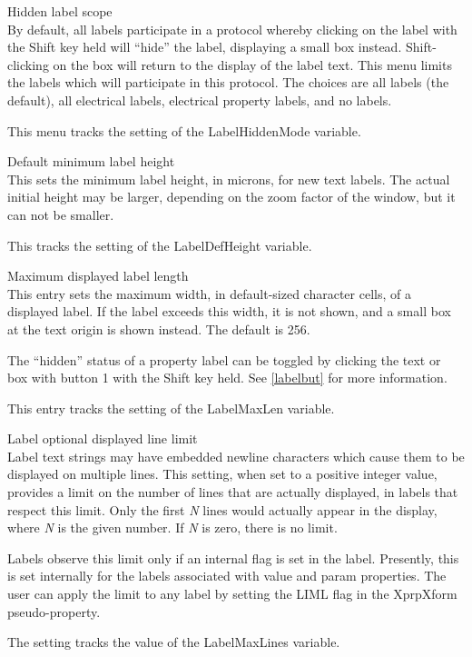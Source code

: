 \begin{description}
\item{\cb Hidden label scope}\\
By default, all labels participate in a protocol whereby clicking on
the label with the {\kb Shift} key held will ``hide'' the label,
displaying a small box instead.  {\kb Shift}-clicking on the box will
return to the display of the label text.  This menu limits the labels
which will participate in this protocol.  The choices are {\cb all
labels} (the default), {\cb all electrical labels}, {\cb electrical
property labels}, and {\cb no labels}.

This menu tracks the setting of the {\et LabelHiddenMode} variable.

\item{\cb Default minimum label height}\\
This sets the minimum label height, in microns, for new text labels. 
The actual initial height may be larger, depending on the zoom factor
of the window, but it can not be smaller. 

This tracks the setting of the {\et LabelDefHeight} variable.

\item{\cb Maximum displayed label length}\\
This entry sets the maximum width, in default-sized character cells,
of a displayed label.  If the label exceeds this width,
it is not shown, and a small box at the text origin is shown instead. 
The default is 256.

The ``hidden'' status of a property label can be toggled by clicking
the text or box with button 1 with the {\kb Shift} key held.
See \ref{labelbut} for more information.

This entry tracks the setting of the {\et LabelMaxLen} variable.

\item{\cb Label optional displayed line limit}\\
Label text strings may have embedded newline characters which cause
them to be displayed on multiple lines.  This setting, when set to a
positive integer value, provides a limit on the number of lines that
are actually displayed, in labels that respect this limit.  Only the
first {\it N} lines would actually appear in the display, where {\it
N} is the given number.  If {\it N} is zero, there is no limit.
 
Labels observe this limit only if an internal flag is set in the
label.  Presently, this is set internally for the labels associated
with {\et value} and {\et param} properties.  The user can apply the
limit to any label by setting the {\vt LIML} flag in the {\vt
XprpXform} pseudo-property.
 
The setting tracks the value of the {\et LabelMaxLines} variable.
\end{description}


